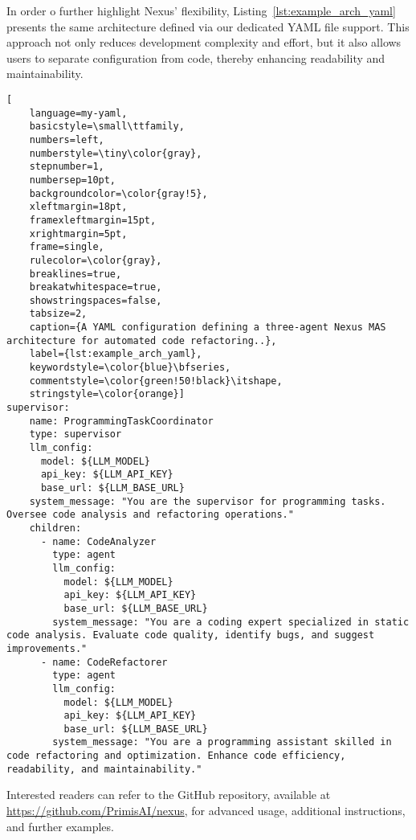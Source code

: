In order o further highlight Nexus' flexibility, Listing~\ref{lst:example_arch_yaml} presents the same architecture defined via our dedicated YAML file support. This approach not only reduces development complexity and effort, but it also allows users to separate configuration from code, thereby enhancing readability and maintainability.

\begin{lstlisting}[
    language=my-yaml,
    basicstyle=\small\ttfamily,
    numbers=left,
    numberstyle=\tiny\color{gray},
    stepnumber=1,
    numbersep=10pt,
    backgroundcolor=\color{gray!5},
    xleftmargin=18pt,
    framexleftmargin=15pt,
    xrightmargin=5pt,
    frame=single,
    rulecolor=\color{gray},
    breaklines=true,
    breakatwhitespace=true,
    showstringspaces=false,
    tabsize=2,
    caption={A YAML configuration defining a three-agent Nexus MAS architecture for automated code refactoring..},
    label={lst:example_arch_yaml},
    keywordstyle=\color{blue}\bfseries,
    commentstyle=\color{green!50!black}\itshape,
    stringstyle=\color{orange}]
supervisor:
    name: ProgrammingTaskCoordinator
    type: supervisor
    llm_config:
      model: ${LLM_MODEL}
      api_key: ${LLM_API_KEY}
      base_url: ${LLM_BASE_URL}
    system_message: "You are the supervisor for programming tasks. Oversee code analysis and refactoring operations."
    children:
      - name: CodeAnalyzer
        type: agent
        llm_config:
          model: ${LLM_MODEL}
          api_key: ${LLM_API_KEY}
          base_url: ${LLM_BASE_URL}
        system_message: "You are a coding expert specialized in static code analysis. Evaluate code quality, identify bugs, and suggest improvements."
      - name: CodeRefactorer
        type: agent
        llm_config:
          model: ${LLM_MODEL}
          api_key: ${LLM_API_KEY}
          base_url: ${LLM_BASE_URL}
        system_message: "You are a programming assistant skilled in code refactoring and optimization. Enhance code efficiency, readability, and maintainability."
\end{lstlisting}

Interested readers can refer to the GitHub repository, available at \url{https://github.com/PrimisAI/nexus}, for advanced usage, additional instructions, and further examples.